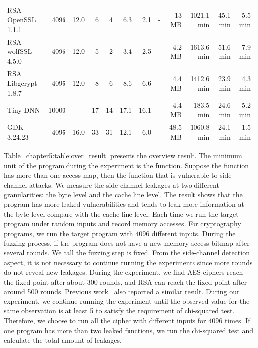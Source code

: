 \begin{table}
{\begin{tabular}{lrrrrrrrrrrr}
RSA OpenSSL 1.1.1& 4096 & 12.0 &6&4&6.3& 2.1&-&13 MB & 1021.1 min & 45.1 min & 5.5 min\\
RSA wolfSSL 4.5.0& 4096 & 12.0 &5&2&3.4& 2.5&-&4.2 MB & 1613.6 min & 51.6 min & 7.9 min\\
RSA Libgcrypt 1.8.7& 4096 & 12.0 &8&6&8.6& 6.6&-&4.4 MB & 1412.6 min & 23.9 min & 4.3 min\\
Tiny DNN & 10000 & - & 17&14&17.1&16.1&-& 4.4 MB & 183.5 min & 24.6 min & 5.2 min\\
GDK 3.24.23 & 4096 & 16.0 & 33&31& 12.1& 6.0&-& 48.5 MB & 1060.8 min & 24.1 min & 1.5 min\\
\bottomrule
\end{tabular}
}

\end{table}

Table~\ref{chapter5:table:over_result} presents the overview result. The minimum unit of the program during the experiment is the function. Suppose the function has more than one access map, then the function that is vulnerable to side-channel attacks. We measure the side-channel leakages at two different granularities: the byte level and the cache line level. The result shows that the program has more leaked vulnerabilities and tends to leak more information at the byte level compare with the cache line level. Each time we run the target program under random inputs and record memory accesses. For cryptography programs, we run the target program with $4096$ different inputs. During the fuzzing process, if the program does not have a new memory access bitmap after several rounds. We call the fuzzing step is fixed. From the side-channel detection aspect, it is not necessary to continue running the experiments since more rounds do not reveal new leakages. During the experiment, we find AES ciphers reach the fixed point after about 300 rounds, and RSA can reach the fixed point after around 500 rounds. Previous work~\cite{217537} also reported a similar result. During our experiment, we continue running the experiment until the observed value for the same observation is at least 5 to satisfy the requirement of chi-squared test. Therefore, we choose to run all the cipher with different inputs for $4096$ times.  If one program has more than two leaked functions, we run the chi-squared test and calculate the total amount of leakages.



